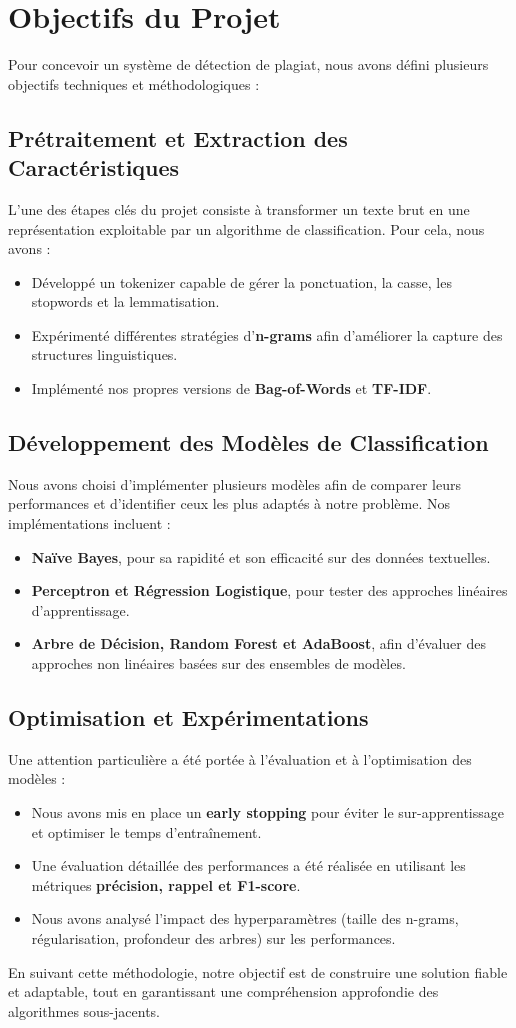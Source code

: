 \section{Objectifs du Projet}

Pour concevoir un système de détection de plagiat, nous avons défini plusieurs objectifs techniques et méthodologiques :

\subsection{Prétraitement et Extraction des Caractéristiques}
L’une des étapes clés du projet consiste à transformer un texte brut en une représentation exploitable par un algorithme de classification. Pour cela, nous avons :
\begin{itemize}
    \item[-] Développé un tokenizer capable de gérer la ponctuation, la casse, les stopwords et la lemmatisation.
    \item[-] Expérimenté différentes stratégies d’\textbf{n-grams} afin d’améliorer la capture des structures linguistiques.
    \item[-] Implémenté nos propres versions de \textbf{Bag-of-Words} et \textbf{TF-IDF}.
\end{itemize}

\subsection{Développement des Modèles de Classification}
Nous avons choisi d’implémenter plusieurs modèles afin de comparer leurs performances et d’identifier ceux les plus adaptés à notre problème. Nos implémentations incluent :
\begin{itemize}
    \item[-] \textbf{Naïve Bayes}, pour sa rapidité et son efficacité sur des données textuelles.
    \item[-] \textbf{Perceptron et Régression Logistique}, pour tester des approches linéaires d’apprentissage.
    \item[-] \textbf{Arbre de Décision, Random Forest et AdaBoost}, afin d’évaluer des approches non linéaires basées sur des ensembles de modèles.
\end{itemize}

\subsection{Optimisation et Expérimentations}
Une attention particulière a été portée à l’évaluation et à l’optimisation des modèles :
\begin{itemize}
    \item[-] Nous avons mis en place un \textbf{early stopping} pour éviter le sur-apprentissage et optimiser le temps d’entraînement.
    \item[-] Une évaluation détaillée des performances a été réalisée en utilisant les métriques \textbf{précision, rappel et F1-score}.
    \item[-] Nous avons analysé l'impact des hyperparamètres (taille des n-grams, régularisation, profondeur des arbres) sur les performances.
\end{itemize}

En suivant cette méthodologie, notre objectif est de construire une solution fiable et adaptable, tout en garantissant une compréhension approfondie des algorithmes sous-jacents.
